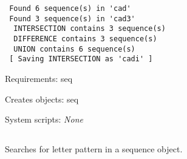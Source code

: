 \begin{description}
\begin{enumerate}
\begin{verbatim}
 Found 6 sequence(s) in 'cad'
 Found 3 sequence(s) in 'cad3'
  INTERSECTION contains 3 sequence(s)
  DIFFERENCE contains 3 sequence(s)
  UNION contains 6 sequence(s)
 [ Saving INTERSECTION as 'cadi' ]

\end{verbatim}

\end{enumerate}


\item{Requirements:} seq


\item{Creates objects:} seq


\item{System scripts:} {\em None}

\end{description}



\subsection[seq\_pattern]{  }



Searches for letter pattern in a sequence object.


